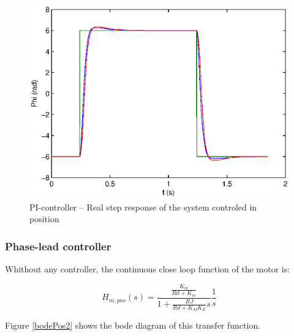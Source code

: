 \begin{center}
\begin{figure}[ht]
 \includegraphics[width=\linewidth]{fig/step_true_pos_tachi.eps}
 \caption{PI-controller -- Real step response of the system controled in position}
 \label{step_true_pos_tachi}
\end{figure}
\end{center}





\subsubsection*{Phase-lead controller}

Whithout any controller, the continuous close loop function of the motor is:

$$ H_{m,pos}(s) = \frac{\frac{K_m}{Rd+K_m}}{1+\frac{RJ}{Rd+K_M K_E}s} \frac{1}{s}$$

Figure \ref{bodePos2} shows the bode diagram of this transfer function.

